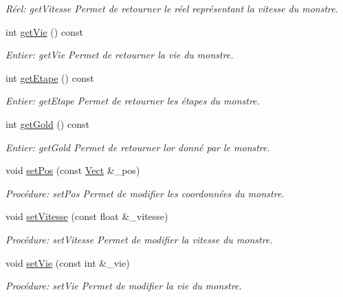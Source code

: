 \begin{DoxyCompactItemize}
\begin{DoxyCompactList}\small\item\em Réel\+: get\+Vitesse Permet de retourner le réel représentant la vitesse du monstre. \end{DoxyCompactList}\item 
int \hyperlink{classMonstre_a60b049ee5c4060f8aa512974414b2129}{get\+Vie} () const
\begin{DoxyCompactList}\small\item\em Entier\+: get\+Vie Permet de retourner la vie du monstre. \end{DoxyCompactList}\item 
int \hyperlink{classMonstre_a255b98ed4faab15ecd13a315414a5b94}{get\+Etape} () const
\begin{DoxyCompactList}\small\item\em Entier\+: get\+Etape Permet de retourner les étapes du monstre. \end{DoxyCompactList}\item 
int \hyperlink{classMonstre_a4a71cce5e0825e0e331bfdd3538a9b30}{get\+Gold} () const
\begin{DoxyCompactList}\small\item\em Entier\+: get\+Gold Permet de retourner l\textquotesingle{}or donné par le monstre. \end{DoxyCompactList}\item 
void \hyperlink{classMonstre_ac1ba6618f2a485ea20a448dbbddbf368}{set\+Pos} (const \hyperlink{classVect}{Vect} \&\+\_\+pos)
\begin{DoxyCompactList}\small\item\em Procédure\+: set\+Pos Permet de modifier les coordonnées du monstre. \end{DoxyCompactList}\item 
void \hyperlink{classMonstre_a900cdfe95acf91d17bcf8b33e2b59a97}{set\+Vitesse} (const float \&\+\_\+vitesse)
\begin{DoxyCompactList}\small\item\em Procédure\+: set\+Vitesse Permet de modifier la vitesse du monstre. \end{DoxyCompactList}\item 
void \hyperlink{classMonstre_ad26a170300007ea8c78348a29123de5c}{set\+Vie} (const int \&\+\_\+vie)
\begin{DoxyCompactList}\small\item\em Procédure\+: set\+Vie Permet de modifier la vie du monstre. \end{DoxyCompactList}\item 

\end{DoxyCompactItemize}
